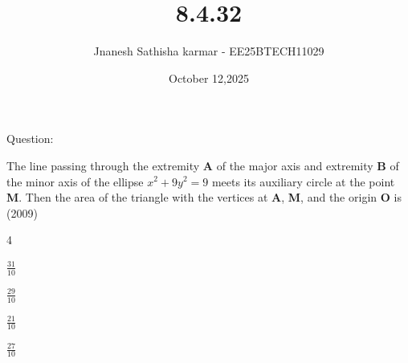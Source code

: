 \documentclass{beamer}
\title %
{8.4.32}
\date{October 12,2025}
\author 
{Jnanesh Sathisha karmar - EE25BTECH11029}
\begin{document}
\frame{\titlepage}
\begin{frame}{Question:}


The line passing through the extremity \textbf{A} of the major axis and extremity \textbf{B} of the minor axis of the ellipse $x^2 + 9y^2 = 9$ meets its auxiliary circle at the point \textbf{M}. Then the area of the triangle with the vertices at \textbf{A}, \textbf{M}, and the origin \textbf{O} is (2009) \\
\begin{enumerate}
\begin{multicols}{4}
    \item $\frac{31}{10}$
    \item $\frac{29}{10}$ 
    \item $\frac{21}{10}$
    \item  $\frac{27}{10}$
\end{multicols}
\end{enumerate}
\end{frame}
\end{document}
